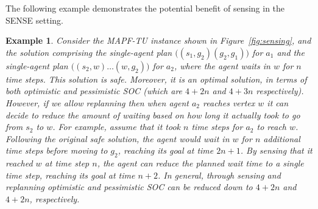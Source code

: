 \documentclass[jair,twoside,11pt,theapa]{article}
\newcommand{\mapftu}{MAPF-TU\xspace}
\newcommand{\sense}{SENSE\xspace}
\newtheorem{example}{Example}
\begin{document}
The following example demonstrates the potential benefit of sensing in the \sense setting. 
\begin{example}
\label{ex:sensing-benefits}
Consider the \mapftu instance shown in Figure~\ref{fig:sensing}, 
and the solution comprising the single-agent plan  
$\big((s_1, g_2)(g_2, g_1)\big)$ for $a_1$ 
and the single-agent plan $\big((s_2, w) \dots (w, g_2)\big)$ 
for $a_2$, where the agent waits in $w$ for $n$ time steps. 
This solution is safe. 
Moreover, it is an optimal solution, in terms of both optimistic and pessimistic SOC (which are $4+2n$ and $4+3n$ respectively). 
However, if we allow replanning then when agent $a_2$ reaches vertex $w$ it can decide to reduce the amount of waiting based on how long it actually took to go from $s_2$ to $w$.
For example, assume that it took $n$ time steps for $a_2$ to reach $w$. 
Following the original safe solution, the agent would wait in $w$ for $n$ additional time steps before moving to $g_2$, reaching its goal at time $2n+1$. By sensing that it reached $w$ at time step $n$, the agent can reduce the planned wait time to a single time step, reaching its goal at time $n+2$. 
In general, through sensing and replanning optimistic and pessimistic SOC can be reduced down to $4+2n$ and $4+2n$, respectively. 
%
\end{example}
\end{document}
